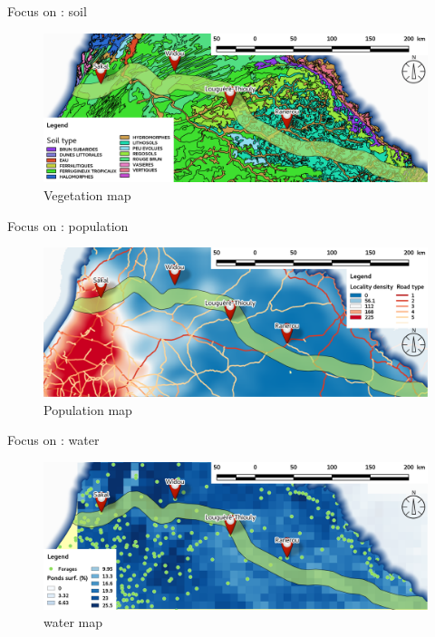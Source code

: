 \documentclass[newPxFont]{beamer}
\begin{document}
\begin{frame}[c]{Focus on : soil}
\vspace{-1cm}
\begin{figure}
	\centering
	\includegraphics[width = \textwidth]{img/sol_map.png}
	\caption{Vegetation map}
\end{figure}
\end{frame}

\begin{frame}[c]{Focus on : population}
\vspace{-1cm}
\begin{figure}
	\centering
	\includegraphics[width = \textwidth]{img/pop_map.png}
	\caption{Population map}
\end{figure}
\end{frame}

\begin{frame}[c]{Focus on : water}
\vspace{-1cm}
\begin{figure}
	\centering
	\includegraphics[width = \textwidth]{img/water_map.png}
	\caption{water map}
\end{figure}
\end{frame}
\end{document}
